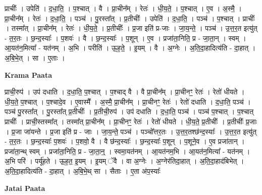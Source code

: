 \documentclass[17pt]{extarticle}
\begin{document}
प्राचीः᳚ । उपेति॑ । द॒धा॒ति॒ । प॒श्चात् । वै । प्रा॒चीन᳚म् । रेतः॑ । धी॒य॒ते॒ । प॒श्चात् । ए॒व । अ॒स्मै॒ । प्रा॒चीन᳚म् । रेतः॑ । द॒धा॒ति॒ । पञ्च॑ । पु॒रस्ता᳚त् । प्र॒तीचीः᳚ । उपेति॑ । द॒धा॒ति॒ । पञ्च॑ । प॒श्चात् । प्राचीः᳚ । तस्मा᳚त् । प्रा॒चीन᳚म् । रेतः॑ । धी॒य॒ते॒ । प्र॒तीचीः᳚ । प्र॒जा इति॑ प्र-जाः । जा॒य॒न्ते॒ । पञ्च॑ । उ॒त्त॒र॒त इत्यु॑त् - त॒र॒तः । छ॒न्द॒स्याः᳚ । प॒शवः॑ । वै । छ॒न्द॒स्याः᳚ । प॒शून् । ए॒व । प्रजा॑ता॒निति॒ प्र - जा॒ता॒न् । स्वम् । आ॒यत॑न॒मित्या᳚ - यत॑नम् । अ॒भि । परीति॑ । ऊ॒ह॒ते॒ । इ॒यम् । वै । अ॒ग्नेः । अ॒ति॒दा॒हादित्य॑ति - दा॒हात् । अ॒बि॒भे॒त् । सा । ए॒ताः ।  \newline


\textbf{Krama Paata} \newline

प्राची॒रुप॑ । उप॑ दधाति । द॒धा॒ति॒ प॒श्चात् । प॒श्चाद् वै । वै प्रा॒चीन᳚म् । प्रा॒चीनꣳ॒॒ रेतः॑ । रेतो॑ धीयते । धी॒य॒ते॒ प॒श्चात् । प॒श्चादे॒व । ए॒वास्मै᳚ । अ॒स्मै॒ प्रा॒चीन᳚म् । प्रा॒चीनꣳ॒॒ रेतः॑ । रेतो॑ दधाति । द॒धा॒ति॒ पञ्च॑ । पञ्च॑ पु॒रस्ता᳚त् । पु॒रस्ता᳚त् प्र॒तीचीः᳚ । प्र॒तीची॒रुप॑ । उप॑ दधाति । द॒धा॒ति॒ पञ्च॑ । पञ्च॑ प॒श्चात् । प॒श्चात् प्राचीः᳚ । प्राची॒स्तस्मा᳚त् । तस्मा᳚त् प्रा॒चीन᳚म् । प्रा॒चीनꣳ॒॒ रेतः॑ । रेतो॑ धीयते । धी॒य॒ते॒ प्र॒तीचीः᳚ । प्र॒तीचीः᳚ प्र॒जाः । प्र॒जा जा॑यन्ते । प्र॒जा इति॑ प्र - जाः । जा॒य॒न्ते॒ पञ्च॑ । पञ्चो᳚त्तर॒तः । उ॒त्त॒र॒तश्छ॑न्द॒स्याः᳚ । उ॒त्त॒र॒त इत्यु॑त् - त॒र॒तः । छ॒न्द॒स्याः᳚ प॒शवः॑ । प॒शवो॒ वै । वै छ॑न्द॒स्याः᳚ । छ॒न्द॒स्याः᳚ प॒शून् । प॒शूने॒व । ए॒व प्रजा॑तान् । प्रजा॑ता॒न्थ् स्वम् । प्रजा॑ता॒निति॒ प्र - जा॒ता॒न्॒ । स्वमा॒यत॑नम् । आ॒यत॑नम॒भि । आ॒यत॑न॒मित्या᳚ - यत॑नम् । अ॒भि परि॑ । पर्यू॑हते । ऊ॒ह॒त॒ इ॒यम् । इ॒यम् ॅवै । वा अ॒ग्नेः । अ॒ग्नेर॑तिदा॒हात् । अ॒ति॒दा॒हाद॑बिभेत् । अ॒ति॒दा॒हादित्य॑ति - दा॒हात् । अ॒बि॒भे॒थ् सा । सैताः । ए॒ता अ॑प॒स्याः᳚ \newline

\textbf{Jatai Paata} \newline
\end{document}

